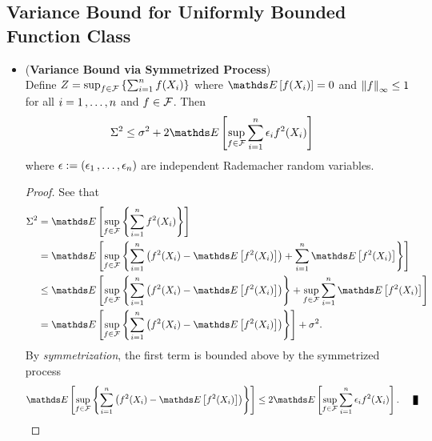 \documentclass[11pt]{article}
\begin{document}
\subsection{Variance Bound for Uniformly Bounded Function Class}
\begin{itemize}
\item \begin{lemma}(\textbf{Variance Bound via Symmetrized Process}) \citep{boucheron2013concentration}\\
Define $Z =  \sup_{f \in {\mathcal F}}\left\{\sum_{i=1}^n f(X_i)\right\}$  where $\E{}{f(X_i)} =0$  and $\left\|f\right\|_{\infty} \le 1$ for all $i = 1 \,{,}\ldots{,}\, n$ and $f \in {\mathcal F}$. Then
\begin{align}
\Sigma^2 &\le \sigma^2 + 2 \E{}{\sup_{f \in \cF}\sum_{i=1}^{n}\epsilon_i f^2(X_i)}\label{ineqn: weak_variance_bound}
\end{align} where $\epsilon := (\epsilon_1 \,{,}\ldots{,}\, \epsilon_n)$ are  independent Rademacher random variables.
\end{lemma}
\begin{proof}
See that 
\begin{align*}
\Sigma^2 &= \E{}{\sup_{f \in \cF}\set{\sum_{i=1}^{n}f^2(X_i)}} \\
&= \E{}{\sup_{f \in \cF}\set{\sum_{i=1}^{n}\paren{f^2(X_i) - \E{}{f^2(X_i)}} + \sum_{i=1}^{n}\E{}{f^2(X_i)} }}\\
&\le   \E{}{\sup_{f \in \cF}\set{\sum_{i=1}^{n}\paren{f^2(X_i) - \E{}{f^2(X_i)}}} + \sup_{f\in \cF}\sum_{i=1}^{n}\E{}{f^2(X_i)}  } \\
&= \E{}{\sup_{f \in \cF}\set{\sum_{i=1}^{n}\paren{f^2(X_i) - \E{}{f^2(X_i)}}}} + \sigma^2.
\end{align*} By \emph{symmetrization}, the first term is bounded above by the symmetrized process
\begin{align*}
\E{}{\sup_{f \in \cF}\set{\sum_{i=1}^{n}\paren{f^2(X_i) - \E{}{f^2(X_i)}}}}& \le 2 \E{}{\sup_{f \in \cF}\sum_{i=1}^{n}\epsilon_i f^2(X_i)}. \qed
\end{align*}
\end{proof}


\end{itemize}
\end{document}
